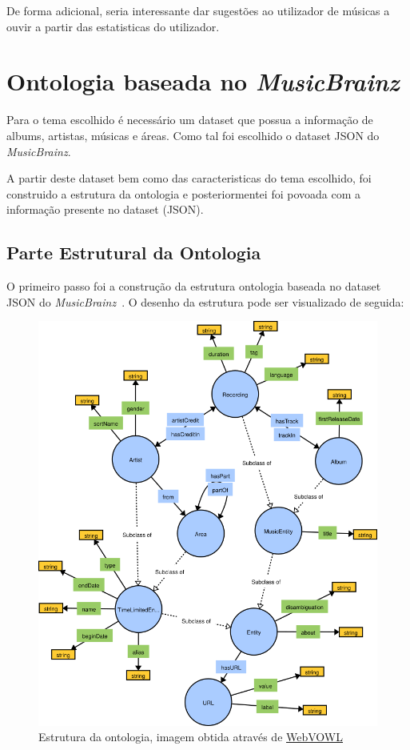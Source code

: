 \documentclass{article}
\begin{document}
De forma adicional, seria interessante dar sugestões ao utilizador de músicas a ouvir a partir das estatisticas do utilizador.

\section{Ontologia baseada no \textit{MusicBrainz}} \label{ontologia}

Para o tema escolhido é necessário um dataset que possua a informação de albums, artistas, músicas e áreas. Como tal foi escolhido o dataset JSON do \textit{MusicBrainz}.

A partir deste dataset bem como das caracteristicas do tema escolhido, foi construido a estrutura da ontologia e posteriormentei foi povoada com a informação presente no dataset (JSON).

\subsection{Parte Estrutural da Ontologia}

O primeiro passo foi a construção da estrutura ontologia baseada no dataset JSON do \textit{MusicBrainz}~\cite{mbSchema}. O desenho da estrutura pode ser visualizado de seguida:

\begin{figure}[H]
    \centering
    \includegraphics[width=15cm]{Pictures/ontologySctructure.png}
    \caption{Estrutura da ontologia, imagem obtida através de \protect\href{http://www.visualdataweb.de/webvowl/}{WebVOWL}}
\end{figure}
\end{document}
